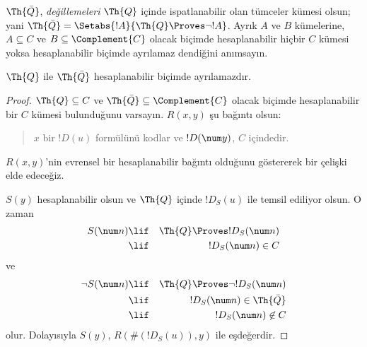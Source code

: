 




$\Th{\bar Q}$, {\em değillemeleri} $\Th{Q}$ içinde ispatlanabilir olan
tümceler kümesi olsun; yani
$\Th{\bar Q} = \Setabs{!A}{\Th{Q} \Proves \lnot !A}$. Ayrık $A$ ve $B$
kümelerine, $A \subseteq C$ ve $B \subseteq \Complement{C}$ olacak biçimde
hesaplanabilir hiçbir $C$ kümesi yoksa hesaplanabilir biçimde ayrılamaz
dendiğini anımsayın.

\begin{lem}
$\Th{Q}$ ile $\Th{\bar Q}$ hesaplanabilir biçimde ayrılamazdır.
\end{lem}

\begin{proof}
$\Th{Q} \subseteq C$ ve $\Th{\bar Q} \subseteq \Complement{C}$ olacak
biçimde hesaplanabilir bir $C$ kümesi bulunduğunu varsayın. $R(x,y)$ şu
bağıntı olsun:
\begin{quote}
$x$ bir $!D(u)$ formülünü kodlar ve $!D(\num y)$, $C$ içindedir.
\end{quote}
$R(x,y)$'nin evrensel bir hesaplanabilir bağıntı olduğunu göstererek bir
çelişki elde edeceğiz.

$S(y)$ hesaplanabilir olsun ve $\Th{Q}$ içinde $!D_S(u)$ ile temsil ediliyor
olsun. O zaman
\begin{eqnarray*}
S(\num n) & \lif & \Th{Q} \Proves !D_S(\num n) \\
& \lif & !D_S(\num n) \in C
\end{eqnarray*}
ve
\begin{eqnarray*}
\lnot S(\num n) & \lif & \Th{Q} \Proves \lnot !D_S(\num n) \\
& \lif & !D_S(\num n) \in \Th{\bar Q} \\
& \lif & !D_S(\num n) \not\in C
\end{eqnarray*}
olur. Dolayısıyla $S(y)$, $R(\#(!D_S(u)),y)$ ile eşdeğerdir.
\end{proof}

